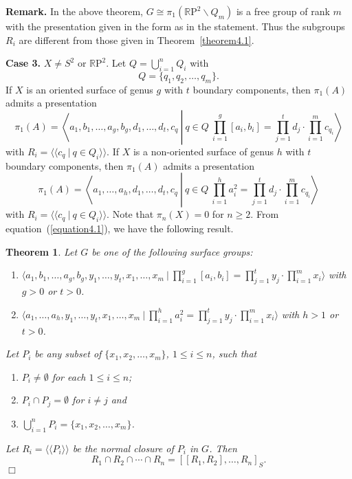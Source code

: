 \documentclass[10pt]{amsart}
\newtheorem{thm}{Theorem}[section]
\let\la=\langle
\let\ra=\rangle
\numberwithin{equation}{section}
\begin{document}
\noindent\textbf{Remark.} In the above theorem, $G\cong \pi_1({\mathbb{R}\mathrm{P}}^2\smallsetminus Q_m)$ is a free group of rank $m$ with the presentation given in the form as in the statement. Thus the subgroups $R_i$ are different from those given in Theorem~\ref{theorem4.1}.

\bigskip

\noindent\textbf{Case 3.} $X\not=S^2$ or ${\mathbb{R}\mathrm{P}}^2$. Let $Q=\bigcup_{i=1}^nQ_i$ with
$$
Q=\{q_1,q_2,\ldots,q_m\}.
$$
If $X$ is an oriented surface of genus $g$ with $t$ boundary components, then $\pi_1(A)$ admits a presentation
$$
\pi_1(A)=\left\la a_1,b_1,\ldots,a_g,b_g, d_1,\ldots,d_t, c_q \ \left| \ q\in Q \ \prod_{i=1}^g[a_i,b_i]=\prod_{j=1}^td_j\cdot \prod_{i=1}^m c_{q_i}\right. \right\ra
$$
with $R_i=\la\la c_q \ | \ q\in Q_i\ra\ra$. If $X$ is a non-oriented surface of genus $h$ with $t$ boundary components, then $\pi_1(A)$ admits a presentation
$$
\pi_1(A)=\left\la a_1,\ldots,a_h, d_1,\ldots,d_t,c_q \ \left| \ q\in Q \ \prod_{i=1}^h a_i^2=\prod_{j=1}^td_j\cdot \prod_{i=1}^m c_{q_i}\right. \right\ra
$$
with $R_i=\la\la c_q \ | \ q\in Q_i\ra\ra$. Note that $\pi_n(X)=0$ for $n\geq 2$. From equation~(\ref{equation4.1}), we have the following result.

\begin{thm}\label{theorem4.3}
Let $G$ be one of the following surface groups:
\begin{enumerate}
\item[(a)] $\la a_1,b_1,\ldots,a_g,b_g, y_1,\ldots,y_t, x_1,\ldots,x_m \ | \ \prod_{i=1}^g[a_i,b_i]=\prod_{j=1}^ty_j\cdot \prod_{i=1}^m x_i\ra$
with $g>0$ or $t>0$.
\item[(b)]  $\la a_1,\ldots,a_h, y_1,\ldots,y_t, x_1,\ldots,x_m \ | \ \prod_{i=1}^h a_i^2=\prod_{j=1}^ty_j\cdot \prod_{i=1}^m x_i\ra$
with $h>1$ or $t>0$.
\end{enumerate}
Let $P_i$ be any subset of $\{x_1,x_2,\ldots,x_m\}$, $1\leq i\leq n$, such that
\begin{enumerate}
\item[(i)] $P_i\not=\emptyset$ for each $1\leq i\leq n$;
\item[(ii)] $P_i\cap P_j=\emptyset$ for $i\not=j$ and
\item[(iii)] $\bigcup_{i=1}^n P_i=\{x_1,x_2,\ldots,x_m\}$.
\end{enumerate}
Let $R_i=\la\la P_i\ra\ra$ be the normal closure of $P_i$ in $G$. Then
$$
R_1\cap R_2\cap\cdots\cap R_n=[[R_1,R_2],\ldots,R_n]_S.
$$\hfill $\Box$
\end{thm}
\end{document}
